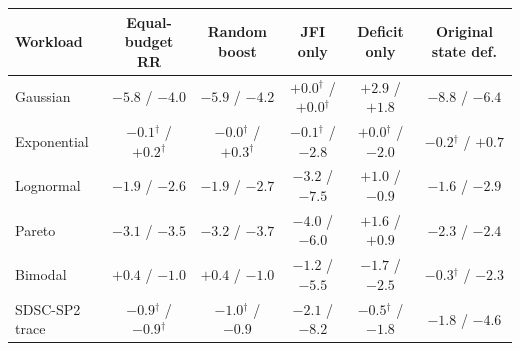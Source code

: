 \begin{tabular}{lccccc}
\toprule
Workload & Equal-budget RR & Random boost & JFI only & Deficit only & Original state def. \\
\midrule
Gaussian & $-5.8$ / $-4.0$ & $-5.9$ / $-4.2$ & $+0.0$$^{\dagger}$ / $+0.0$$^{\dagger}$ & $+2.9$ / $+1.8$ & $-8.8$ / $-6.4$ \\
Exponential & $-0.1$$^{\dagger}$ / $+0.2$$^{\dagger}$ & $-0.0$$^{\dagger}$ / $+0.3$$^{\dagger}$ & $-0.1$$^{\dagger}$ / $-2.8$ & $+0.0$$^{\dagger}$ / $-2.0$ & $-0.2$$^{\dagger}$ / $+0.7$ \\
Lognormal & $-1.9$ / $-2.6$ & $-1.9$ / $-2.7$ & $-3.2$ / $-7.5$ & $+1.0$ / $-0.9$ & $-1.6$ / $-2.9$ \\
Pareto & $-3.1$ / $-3.5$ & $-3.2$ / $-3.7$ & $-4.0$ / $-6.0$ & $+1.6$ / $+0.9$ & $-2.3$ / $-2.4$ \\
Bimodal & $+0.4$ / $-1.0$ & $+0.4$ / $-1.0$ & $-1.2$ / $-5.5$ & $-1.7$ / $-2.5$ & $-0.3$$^{\dagger}$ / $-2.3$ \\
SDSC-SP2 trace & $-0.9$$^{\dagger}$ / $-0.9$$^{\dagger}$ & $-1.0$$^{\dagger}$ / $-0.9$ & $-2.1$ / $-8.2$ & $-0.5$$^{\dagger}$ / $-1.8$ & $-1.8$ / $-4.6$ \\
\bottomrule
\end{tabular}
